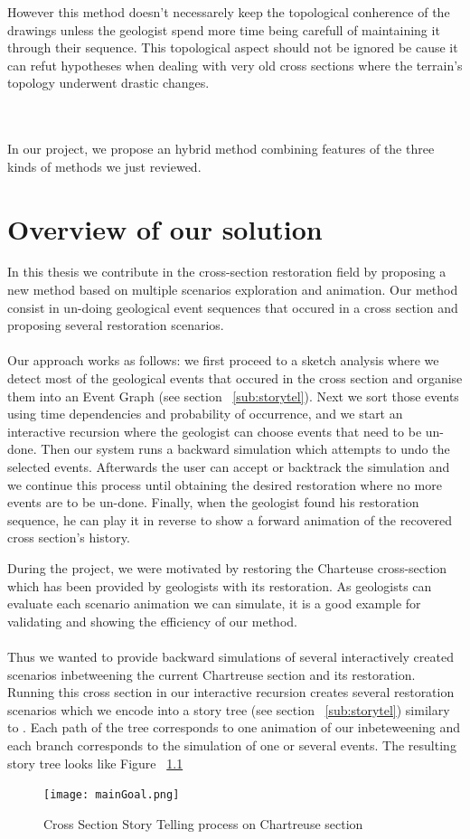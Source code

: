 \documentclass[12pt, a4paper]{report} %
\begin{document}
However this method doesn't necessarely keep the topological conherence of the drawings unless the geologist spend more time being carefull of maintaining it through their sequence. This topological aspect should not be ignored be cause it can refut hypotheses when dealing with very old cross sections where the terrain's topology underwent drastic changes.\\\\\

In our project, we propose an hybrid method combining features of the three kinds of methods we just reviewed.
\chapter{Overview of our solution}

In this thesis we contribute in the cross-section restoration field by proposing a new method based on multiple scenarios exploration and animation. Our method consist in un-doing geological event sequences that occured in a cross section and proposing several restoration scenarios.\\\\

Our approach works as follows: we first proceed to a sketch analysis where we detect most of the geological events that occured in the cross section and organise them into an Event Graph (see section ~\ref{sub:storytel}).
Next we sort those events using time dependencies and probability of occurrence, and we start an interactive recursion where the geologist can choose events that need to be un-done. Then our system runs a backward simulation which attempts to undo the selected events. Afterwards the user can accept or backtrack the simulation and we continue this process until obtaining the desired restoration where no more events are to be un-done.
Finally, when the geologist found his restoration sequence, he can play it in reverse to show a forward animation of the recovered cross section's history.

During the project, we were motivated by restoring the Charteuse cross-section which has been provided by geologists with its restoration. As geologists can evaluate each scenario animation we can simulate, it is a good example for validating and showing the efficiency of our method.\\\\
Thus we wanted to provide backward simulations of several interactively created scenarios inbetweening the current Chartreuse section and its restoration. Running this cross section in our interactive recursion creates several restoration scenarios which we encode into a story tree (see section ~\ref{sub:storytel}) similary to \cite{lidal}. Each path of the tree corresponds to one animation of our inbeteweening and each branch corresponds to the simulation of one or several events. The resulting story tree looks like Figure ~\ref{maingoal}
 \begin{figure}[H]
	\centering
	\texttt{[image: mainGoal.png]}
	\caption{Cross Section Story Telling process on Chartreuse section}
	\label{maingoal}
\end{figure}\\
\end{document}
